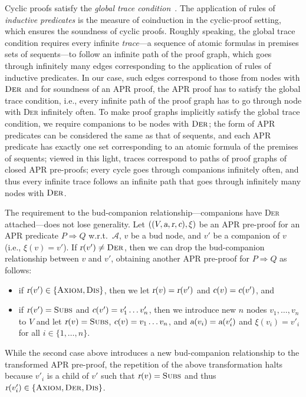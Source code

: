 \documentclass[10pt,a4paper]{article}
\def\cA{\mathcal{A}}
\newcommand{\ReachPred}[2]{#1 \Rightarrow #2}
\newcommand{\RuleName}[1]{{\rm \textsc{#1}}}
\newcommand{\varsl}[1]{\mbox{\sl #1}}
\begin{document}
Cyclic proofs satisfy the \emph{global trace condition}~\cite{Bro05}.
The application of rules of \emph{inductive predicates} is the measure of coinduction in the cyclic-proof setting, which ensures the soundness of cyclic proofs.
Roughly speaking, the global trace condition requires every infinite \emph{trace}---a sequence of atomic formulas in premises sets of sequents---to follow an infinite path of the proof graph, which goes through infinitely many edges corresponding to the application of rules of inductive predicates.
In our case, such edges correspond to those from nodes with $\mbox{\rm\RuleName{Der}}$ and for soundness of an APR proof, the APR proof has to satisfy the global trace condition, i.e., every infinite path of the proof graph has to go through node with \RuleName{Der} infinitely often.
To make proof graphs implicitly satisfy the global trace condition, we require companions to be nodes with $\mbox{\rm\RuleName{Der}}$;
the form of APR predicates can be considered the same as that of sequents, and each APR predicate has exactly one set corresponding to an atomic formula of the premises of sequents;
viewed in this light, traces correspond to paths of proof graphs of closed APR pre-proofs;
every cycle goes through companions infinitely often, and thus every infinite trace follows an infinite path that goes through infinitely many nodes with $\mbox{\rm\RuleName{Der}}$.

The requirement to the bud-companion relationship---companions have \RuleName{Der} attached---does not lose generality.
Let $((V,\varsl{a},\varsl{r},\varsl{c}),\xi)$ be an APR pre-proof for an APR predicate $\ReachPred{P}{Q}$ w.r.t.\ $\cA$, $v$ be a bud node, and $v'$ be a companion of $v$ (i.e., $\xi(v)=v'$).
If $\varsl{r}(v') \ne \mbox{\rm\RuleName{Der}}$, then we can drop the bud-companion relationship between $v$ and $v'$, obtaining another APR pre-proof for $\ReachPred{P}{Q}$ as follows:
\begin{itemize}
	\item if $\varsl{r}(v') \in \{\mbox{\rm\RuleName{Axiom}}, \mbox{\rm\RuleName{Dis}}\}$, then we let
	      $\varsl{r}(v) = \varsl{r}(v')$ and $\varsl{c}(v)=\varsl{c}(v')$,
	      and
	\item if $\varsl{r}(v')=\mbox{\rm\RuleName{Subs}}$ and $\varsl{c}(v')=v'_1\ldots v'_n$, then
	      we introduce new $n$ nodes $v_1,\ldots,v_n$ to $V$ and let
	      $\varsl{r}(v) = \mbox{\rm\RuleName{Subs}}$,
	      $\varsl{c}(v)=v_1\ldots v_n$,
	      and
	      $\varsl{a}(v_i) = \varsl{a}(v'_i)$ and $\xi(v_i)=v'_i$ for all $i \in \{1,\ldots,n\}$.
\end{itemize}
While the second case above introduces a new bud-companion relationship to the transformed APR pre-proof, the repetition of the above transformation halts because $v'_i$ is a child of $v'$ such that $\varsl{r}(v)=\mbox{\rm\RuleName{Subs}}$ and thus $\varsl{r}(v'_i) \in  \{\mbox{\rm\RuleName{Axiom}},\mbox{\rm\RuleName{Der}},\mbox{\rm\RuleName{Dis}}\}$.
\end{document}
